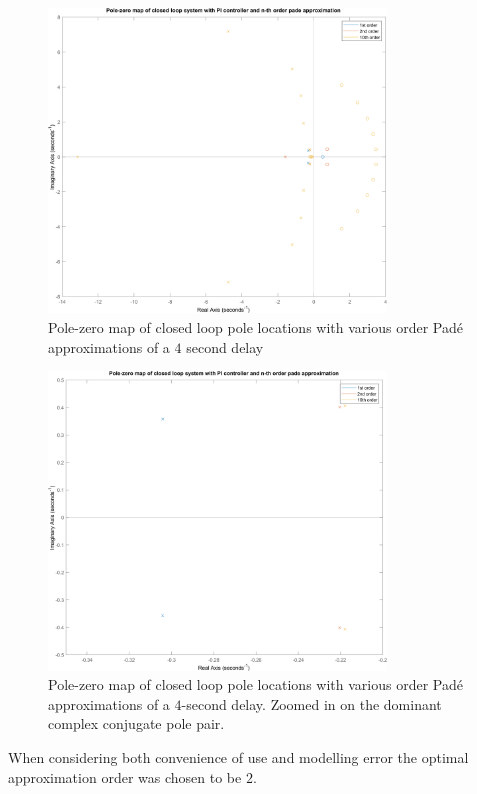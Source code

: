 \begin{figure}[h!]
	\centering
	\includegraphics[width=0.8\textwidth]{Pictures/PZmap_CL.png}
	\caption{Pole-zero map of closed loop pole locations with various order Padé approximations of a $ 4 $ second delay}
	\label{fig:CLPoles}
\end{figure}
\begin{figure}[h!]
	\centering
	\includegraphics[width=0.8\textwidth]{Pictures/PZmap_CL_zoom.png}
	\caption{Pole-zero map of closed loop pole locations with various order Padé approximations of a $4$-second delay. Zoomed in on the dominant complex conjugate pole pair.}
	\label{fig:CLPolesZoom}
\end{figure}
When considering both convenience of use and modelling error the optimal approximation order was chosen to be $ 2 $.


